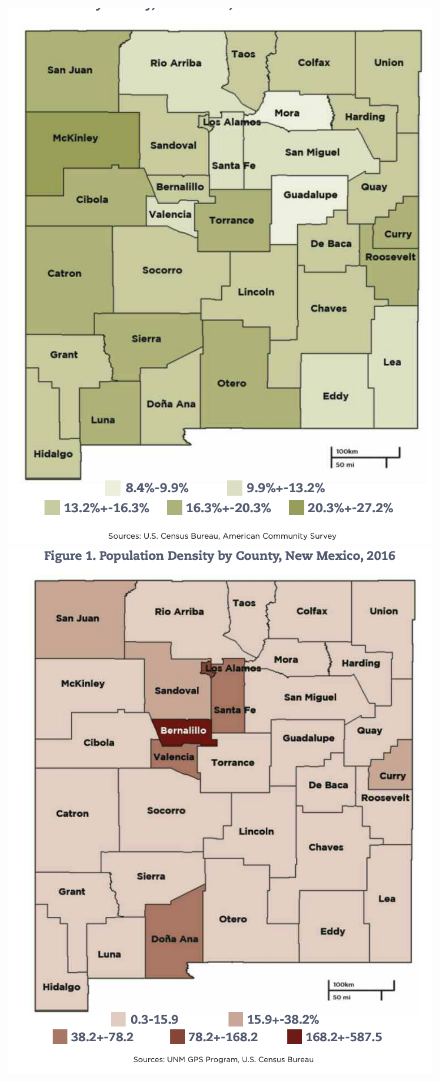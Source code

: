\documentclass{article}
\begin{document}
{\begin{figure}
\includegraphics[scale=.5]{food_insecurity-plot}
\includegraphics[scale=.5]{pop_density-plot}

\end{figure}}
\end{document}

